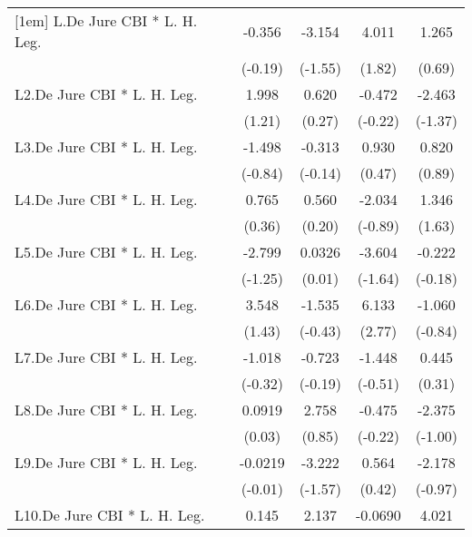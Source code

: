 {\begin{longtable}{l*{4}{c}}
[1em]
L.De Jure CBI * L. H. Leg.&   -0.356         &   -3.154         &    4.011         &    1.265         \\
                &  (-0.19)         &  (-1.55)         &   (1.82)         &   (0.69)         \\
[1em]
L2.De Jure CBI * L. H. Leg.&    1.998         &    0.620         &   -0.472         &   -2.463         \\
                &   (1.21)         &   (0.27)         &  (-0.22)         &  (-1.37)         \\
[1em]
L3.De Jure CBI * L. H. Leg.&   -1.498         &   -0.313         &    0.930         &    0.820         \\
                &  (-0.84)         &  (-0.14)         &   (0.47)         &   (0.89)         \\
[1em]
L4.De Jure CBI * L. H. Leg.&    0.765         &    0.560         &   -2.034         &    1.346         \\
                &   (0.36)         &   (0.20)         &  (-0.89)         &   (1.63)         \\
[1em]
L5.De Jure CBI * L. H. Leg.&   -2.799         &   0.0326         &   -3.604         &   -0.222         \\
                &  (-1.25)         &   (0.01)         &  (-1.64)         &  (-0.18)         \\
[1em]
L6.De Jure CBI * L. H. Leg.&    3.548         &   -1.535         &    6.133\sym{**} &   -1.060         \\
                &   (1.43)         &  (-0.43)         &   (2.77)         &  (-0.84)         \\
[1em]
L7.De Jure CBI * L. H. Leg.&   -1.018         &   -0.723         &   -1.448         &    0.445         \\
                &  (-0.32)         &  (-0.19)         &  (-0.51)         &   (0.31)         \\
[1em]
L8.De Jure CBI * L. H. Leg.&   0.0919         &    2.758         &   -0.475         &   -2.375         \\
                &   (0.03)         &   (0.85)         &  (-0.22)         &  (-1.00)         \\
[1em]
L9.De Jure CBI * L. H. Leg.&  -0.0219         &   -3.222         &    0.564         &   -2.178         \\
                &  (-0.01)         &  (-1.57)         &   (0.42)         &  (-0.97)         \\
[1em]
L10.De Jure CBI * L. H. Leg.&    0.145         &    2.137         &  -0.0690         &    4.021         \\

\end{longtable}}
